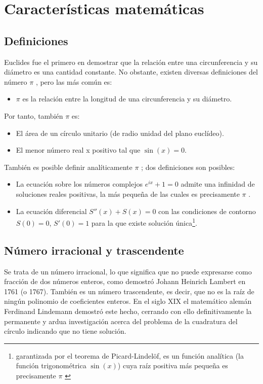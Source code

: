 \documentclass[spanish,a4paper,11pt]{article}
\newcommand{\PI}{{$\pi$ }}
\begin{document}
\section{Características matemáticas}

\subsection{Definiciones}

Euclides fue el primero en demostrar que la relación entre una circunferencia y su diámetro es una cantidad constante\cite{Eucli}.
No obstante, existen diversas definiciones del número \PI, pero las más común es:

\begin{itemize}
\item \PI es la relación entre la longitud de una circunferencia y su diámetro.
\end{itemize}

Por tanto, también \PI es:

\begin{itemize}
\item El área de un círculo unitario (de radio unidad del plano euclídeo).
\item El menor número real x positivo tal que $\sin(x) = 0$.
\end{itemize}

También es posible definir analíticamente \PI; dos definiciones son posibles:

\begin{itemize}
\item La ecuación sobre los números complejos $e^{ix}+1=0$ admite una infinidad de soluciones reales positivas, la más pequeña de las cuales es precisamente \PI.
\item La ecuación diferencial $S''(x)+S(x)=0$ con las condiciones de contorno $S(0)=0$, $S'(0)=1$ para la que existe solución única\footnote {garantizada por el teorema de
Picard-Lindelöf, es un función analítica (la función trigonométrica $\sin(x)$) cuya raíz positiva más pequeña es precisamente \PI}.
\end{itemize}



\subsection{Número irracional y trascendente}
Se trata de un número irracional, lo que significa que no puede expresarse como fracción de dos números enteros, como demostró Johann Heinrich Lambert
en 1761 (o 1767). También es un número trascendente, es decir, que no es la raíz de ningún polinomio de coeficientes enteros. En el siglo XIX el matemático
alemán Ferdinand Lindemann demostró este hecho, cerrando con ello definitivamente la permanente y ardua investigación acerca del problema de la cuadratura
del círculo indicando que no tiene solución.
\end{document}
